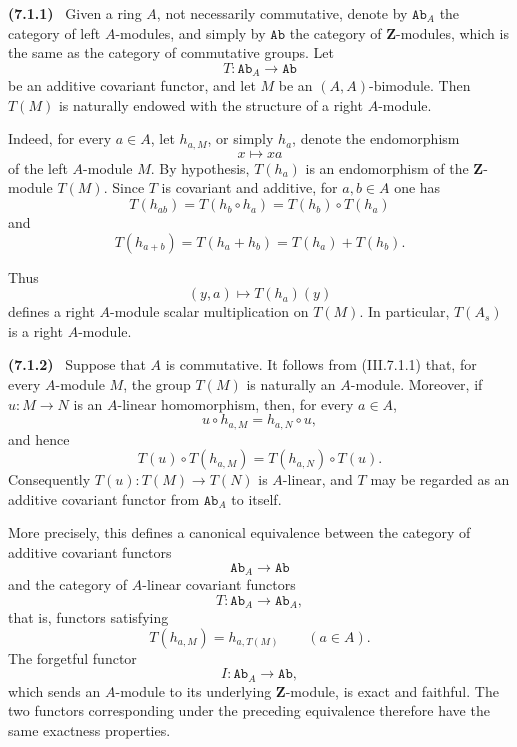 \documentclass[10pt,oneside]{book}
\newcommand{\bb}[1]{\mathbf{#1}}
\newcommand{\cat}[1]{\mathtt{#1}}
\newcommand{\sref}[2][]{(#2)}
\newenvironment{env}[1][]{\par\medskip\noindent\textbf{(#1)}\ }{\par}
\begin{document}
\begin{env}[7.1.1]
\label{III.7.1.1}
Given a ring $A$, not necessarily commutative, denote by
$\cat{Ab}_A$ the category of left $A$-modules, and simply by
$\cat{Ab}$ the category of $\bb Z$-modules, which is the same
as the category of commutative groups.  Let
\[
  T:\cat{Ab}_A\longrightarrow\cat{Ab}
\]
be an additive covariant functor, and let $M$ be an
$(A,A)$-bimodule.  Then $T(M)$ is naturally endowed with the
structure of a right $A$-module.

Indeed, for every $a\in A$, let $h_{a,M}$, or simply $h_a$,
denote the endomorphism
\[
  x\longmapsto xa
\]
of the left $A$-module $M$.  By hypothesis, $T(h_a)$ is an
endomorphism of the $\bb Z$-module $T(M)$.  Since $T$ is
covariant and additive, for $a,b\in A$ one has
\[
  T(h_{ab})
  =
  T(h_b\circ h_a)
  =
  T(h_b)\circ T(h_a)
\]
and
\[
  T(h_{a+b})
  =
  T(h_a+h_b)
  =
  T(h_a)+T(h_b).
\]
\par\medskip\noindent Thus
\[
  (y,a)\longmapsto T(h_a)(y)
\]
defines a right $A$-module scalar multiplication on $T(M)$.
In particular, $T(A_s)$ is a right $A$-module.
\end{env}

\begin{env}[7.1.2]
\label{III.7.1.2}
Suppose that $A$ is commutative.  It follows from
\sref{III.7.1.1} that, for every $A$-module $M$, the group
$T(M)$ is naturally an $A$-module.  Moreover, if
$u:M\to N$ is an $A$-linear homomorphism, then, for every
$a\in A$,
\[
  u\circ h_{a,M}=h_{a,N}\circ u,
\]
and hence
\[
  T(u)\circ T(h_{a,M})
  =
  T(h_{a,N})\circ T(u).
\]
Consequently $T(u):T(M)\to T(N)$ is $A$-linear, and $T$ may be
regarded as an additive covariant functor from $\cat{Ab}_A$ to
itself.

More precisely, this defines a canonical equivalence between
the category of additive covariant functors
\[
  \cat{Ab}_A\longrightarrow\cat{Ab}
\]
and the category of $A$-linear covariant functors
\[
  T:\cat{Ab}_A\longrightarrow\cat{Ab}_A,
\]
that is, functors satisfying
\[
  T(h_{a,M})=h_{a,T(M)}
  \qquad(a\in A).
\]
The forgetful functor
\[
  I:\cat{Ab}_A\longrightarrow\cat{Ab},
\]
which sends an $A$-module to its underlying $\bb Z$-module, is
exact and faithful.  The two functors corresponding under the
preceding equivalence therefore have the same exactness
properties.
\end{env}
\end{document}
